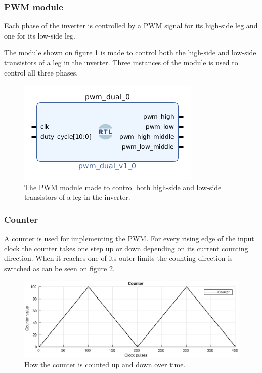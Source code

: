 \subsubsection{PWM module}
\label{sec:pwm}
Each phase of the inverter is controlled by a PWM signal for its high-side leg and one for its low-side leg. 

The module shown on figure \ref{fig:pwm_module} is made to control both the high-side and low-side transistors of a leg in the inverter. Three instances of the module is used to control all three phases.
\begin{figure}[H]
	\centering
	\includegraphics[width=0.5 \textwidth]{pictures/software/pwm_module.png}
	\caption{The PWM module made to control both high-side and low-side transistors of a leg in the inverter.}
	\label{fig:pwm_module}
\end{figure}



\subsubsection*{Counter}
A counter is used for implementing the PWM. For every rising edge of the input clock the counter takes one step up or down depending on its current counting direction. When it reaches one of its outer limits the counting direction is switched as can be seen on figure \ref{fig:counter}.

\begin{figure}[H]
	\centering
	\includegraphics[width=1 \textwidth]{pictures/software/counter.eps}
	\caption{How the counter is counted up and down over time.}
	\label{fig:counter}
\end{figure}

